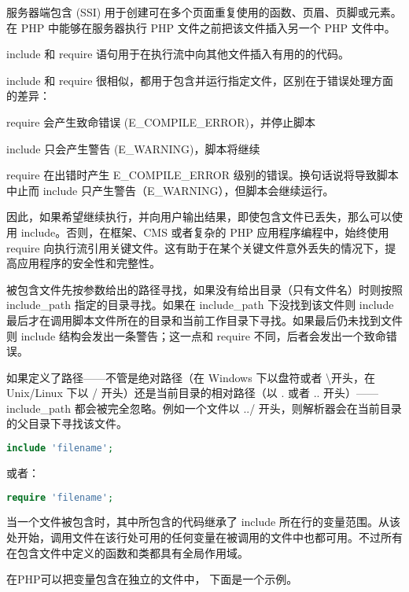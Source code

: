 服务器端包含 (SSI) 用于创建可在多个页面重复使用的函数、页眉、页脚或元素。在 PHP 中能够在服务器执行 PHP 文件之前把该文件插入另一个 PHP 文件中。

include 和 require 语句用于在执行流中向其他文件插入有用的的代码。

include 和 require 很相似，都用于包含并运行指定文件，区别在于错误处理方面的差异：

\begin{compactitem}
\item require 会产生致命错误 (E\_COMPILE\_ERROR)，并停止脚本
\item include 只会产生警告 (E\_WARNING)，脚本将继续
\end{compactitem}

require 在出错时产生 E\_COMPILE\_ERROR 级别的错误。换句话说将导致脚本中止而 include 只产生警告（E\_WARNING），但脚本会继续运行。

因此，如果希望继续执行，并向用户输出结果，即使包含文件已丢失，那么可以使用 include。否则，在框架、CMS 或者复杂的 PHP 应用程序编程中，始终使用 require 向执行流引用关键文件。这有助于在某个关键文件意外丢失的情况下，提高应用程序的安全性和完整性。

被包含文件先按参数给出的路径寻找，如果没有给出目录（只有文件名）时则按照 include\_path 指定的目录寻找。如果在 include\_path 下没找到该文件则 include 最后才在调用脚本文件所在的目录和当前工作目录下寻找。如果最后仍未找到文件则 include 结构会发出一条警告；这一点和 require 不同，后者会发出一个致命错误。

如果定义了路径——不管是绝对路径（在 Windows 下以盘符或者 \textbackslash 开头，在 Unix/Linux 下以 / 开头）还是当前目录的相对路径（以 . 或者 .. 开头）——include\_path 都会被完全忽略。例如一个文件以 ../ 开头，则解析器会在当前目录的父目录下寻找该文件。

\begin{lstlisting}[language=PHP]
include 'filename';
\end{lstlisting}

或者：

\begin{lstlisting}[language=PHP]
require 'filename';
\end{lstlisting}

当一个文件被包含时，其中所包含的代码继承了 include 所在行的变量范围。从该处开始，调用文件在该行处可用的任何变量在被调用的文件中也都可用。不过所有在包含文件中定义的函数和类都具有全局作用域。





在PHP可以把变量包含在独立的文件中， 下面是一个示例。

